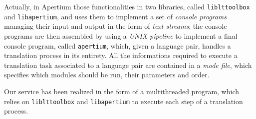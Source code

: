 \documentclass[11pt]{article}
\begin{document}


Actually, in Apertium those functionalities in two libraries, called {\tt\small liblttoolbox} and {\tt\small libapertium}, and uses them to implement a set of \emph{console programs} managing their input and output in the form of \emph{text streams}; the console programs are then assembled by using a \emph{UNIX pipeline} to implement a final console program, called {\tt\small apertium}, which, given a language pair, handles a translation process in its entirety. All the informations required to execute a translation task associated to a language pair are contained in a \emph{mode file}, which specifies which modules should be run, their parameters and order.

Our service has been realized in the form of a multithreaded program, which relies on {\tt\small liblttoolbox} and {\tt\small libapertium} to execute each step of a translation process.


\end{document}
